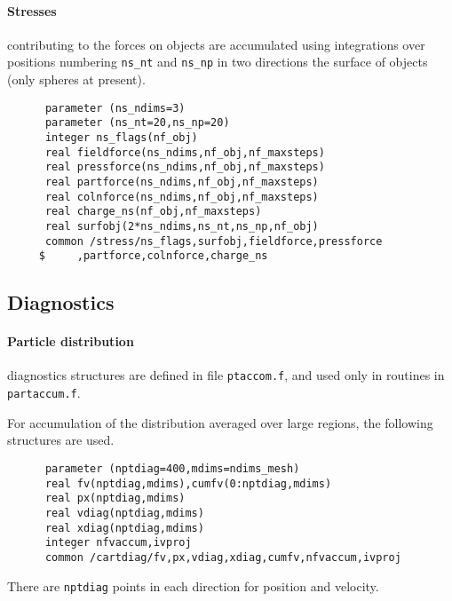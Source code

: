 \documentclass[12pt]{article}
\begin{document}
\paragraph{Stresses} contributing to the forces on objects are
accumulated using integrations over positions numbering \verb!ns_nt! and
\verb!ns_np! in two directions the surface of objects (only
spheres at present). 
\begin{verbatim}
      parameter (ns_ndims=3)
      parameter (ns_nt=20,ns_np=20)
      integer ns_flags(nf_obj)
      real fieldforce(ns_ndims,nf_obj,nf_maxsteps)
      real pressforce(ns_ndims,nf_obj,nf_maxsteps)
      real partforce(ns_ndims,nf_obj,nf_maxsteps)
      real colnforce(ns_ndims,nf_obj,nf_maxsteps)
      real charge_ns(nf_obj,nf_maxsteps)
      real surfobj(2*ns_ndims,ns_nt,ns_np,nf_obj)
      common /stress/ns_flags,surfobj,fieldforce,pressforce
     $     ,partforce,colnforce,charge_ns

\end{verbatim}

\subsection{Diagnostics}

\paragraph{Particle distribution} diagnostics structures are defined in file
\verb!ptaccom.f!, and used only in routines in \verb!partaccum.f!. 

For accumulation of the distribution averaged over large regions, the
following structures are used. 
\begin{verbatim}
      parameter (nptdiag=400,mdims=ndims_mesh)
      real fv(nptdiag,mdims),cumfv(0:nptdiag,mdims)
      real px(nptdiag,mdims)
      real vdiag(nptdiag,mdims)
      real xdiag(nptdiag,mdims)
      integer nfvaccum,ivproj
      common /cartdiag/fv,px,vdiag,xdiag,cumfv,nfvaccum,ivproj
\end{verbatim}
There are \verb!nptdiag! points in each direction for position and velocity.
\end{document}

